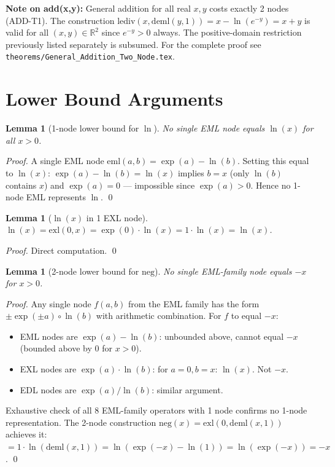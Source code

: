 \documentclass[11pt]{article}
\newtheorem{lemma}[theorem]{Lemma}
\begin{document}
\noindent\textbf{Note on add(x,y):} General addition for all real $x, y$
costs exactly 2 nodes (ADD-T1). The construction
$\mathrm{lediv}(x, \mathrm{deml}(y,1)) = x - \ln(e^{-y}) = x + y$
is valid for all $(x,y) \in \mathbb{R}^2$ since $e^{-y} > 0$ always.
The positive-domain restriction previously listed separately is subsumed.
For the complete proof see \texttt{theorems/General\_Addition\_Two\_Node.tex}.

\section{Lower Bound Arguments}

\begin{lemma}[1-node lower bound for $\ln$]
No single EML node equals $\ln(x)$ for all $x > 0$.
\end{lemma}
\begin{proof}
A single EML node $\mathrm{eml}(a,b) = \exp(a) - \ln(b)$.
Setting this equal to $\ln(x)$: $\exp(a) - \ln(b) = \ln(x)$ implies $b = x$ (only $\ln(b)$
contains $x$) and $\exp(a) = 0$ --- impossible since $\exp(a) > 0$.
Hence no 1-node EML represents $\ln$. \qed
\end{proof}

\begin{lemma}[$\ln(x)$ in 1 EXL node]
$\ln(x) = \mathrm{exl}(0,x) = \exp(0) \cdot \ln(x) = 1 \cdot \ln(x) = \ln(x)$.
\end{lemma}
\begin{proof} Direct computation. \qed \end{proof}

\begin{lemma}[2-node lower bound for $\mathrm{neg}$]
No single EML-family node equals $-x$ for $x > 0$.
\end{lemma}
\begin{proof}
Any single node $f(a,b)$ from the EML family has the form $\pm\exp(\pm a) \circ \ln(b)$
with arithmetic combination. For $f$ to equal $-x$:
\begin{itemize}
\item EML nodes are $\exp(a)-\ln(b)$: unbounded above, cannot equal $-x$ (bounded above by 0 for $x>0$).
\item EXL nodes are $\exp(a)\cdot\ln(b)$: for $a=0, b=x$: $\ln(x)$. Not $-x$.
\item EDL nodes are $\exp(a)/\ln(b)$: similar argument.
\end{itemize}
Exhaustive check of all 8 EML-family operators with 1 node confirms no 1-node representation.
The 2-node construction $\mathrm{neg}(x) = \mathrm{exl}(0, \mathrm{deml}(x,1))$ achieves it:
$= 1 \cdot \ln(\mathrm{deml}(x,1)) = \ln(\exp(-x) - \ln(1)) = \ln(\exp(-x)) = -x$. \qed
\end{proof}
\end{document}
